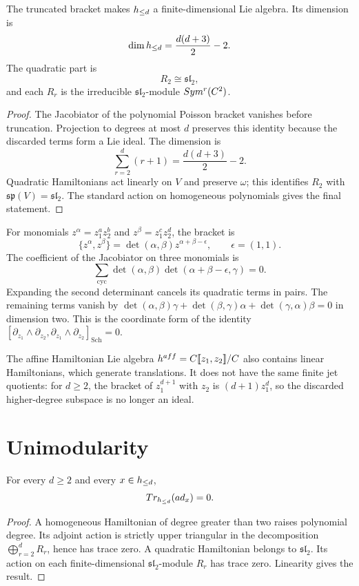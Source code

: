 \begin{theorem}
The truncated bracket makes $h_{\le d}$ a finite-dimensional Lie algebra.  Its dimension is
\[
 \dim h_{\le d}=\frac{d(d+3)}2-2.
\]
The quadratic part is
\[
 R_2\cong\mathfrak{sl}_2,
\]
and each $R_r$ is the irreducible $\mathfrak{sl}_2$-module $Sym^r(C^2)$.
\end{theorem}
\begin{proof}
The Jacobiator of the polynomial Poisson bracket vanishes before truncation.  Projection to degrees at most $d$ preserves this identity because the discarded terms form a Lie ideal.  The dimension is
\[
 \sum_{r=2}^{d}(r+1)
 =\frac{d(d+3)}2-2.
\]
Quadratic Hamiltonians act linearly on $V$ and preserve $\omega$; this identifies $R_2$ with $\mathfrak{sp}(V)=\mathfrak{sl}_2$.  The standard action on homogeneous polynomials gives the final statement.
\end{proof}

For monomials $z^\alpha=z_1^az_2^b$ and
$z^\beta=z_1^cz_2^d$, the bracket is
\[
 \{z^\alpha,z^\beta\}
 =\det(\alpha,\beta)z^{\alpha+\beta-\epsilon},
 \qquad \epsilon=(1,1).
\]
The coefficient of the Jacobiator on three monomials is
\[
 \sum_{\mathrm{cyc}}
 \det(\alpha,\beta)\det(\alpha+\beta-\epsilon,\gamma)=0.
\]
Expanding the second determinant cancels its quadratic terms in pairs.
The remaining terms vanish by
$\det(\alpha,\beta)\gamma+
\det(\beta,\gamma)\alpha+
\det(\gamma,\alpha)\beta=0$ in dimension two.
This is the coordinate form of the identity
$[\partial_{z_1}\wedge\partial_{z_2},
\partial_{z_1}\wedge\partial_{z_2}]_{\mathrm{Sch}}=0$.

The affine Hamiltonian Lie algebra
$h^{aff}=C\llbracket z_1,z_2\rrbracket/C$
also contains linear Hamiltonians, which generate translations.
It does not have the same finite jet quotients: for $d\ge2$, the
bracket of $z_1^{d+1}$ with $z_2$ is $(d+1)z_1^d$, so the discarded
higher-degree subspace is no longer an ideal.

\section{Unimodularity}
\begin{theorem}
For every $d\ge2$ and every $x\in h_{\le d}$,
\[
 Tr_{h_{\le d}}(ad_x)=0.
\]
\end{theorem}
\begin{proof}
A homogeneous Hamiltonian of degree greater than two raises polynomial degree.  Its adjoint action is strictly upper triangular in the decomposition $\bigoplus_{r=2}^{d}R_r$, hence has trace zero.  A quadratic Hamiltonian belongs to $\mathfrak{sl}_2$.  Its action on each finite-dimensional $\mathfrak{sl}_2$-module $R_r$ has trace zero.  Linearity gives the result.
\end{proof}


